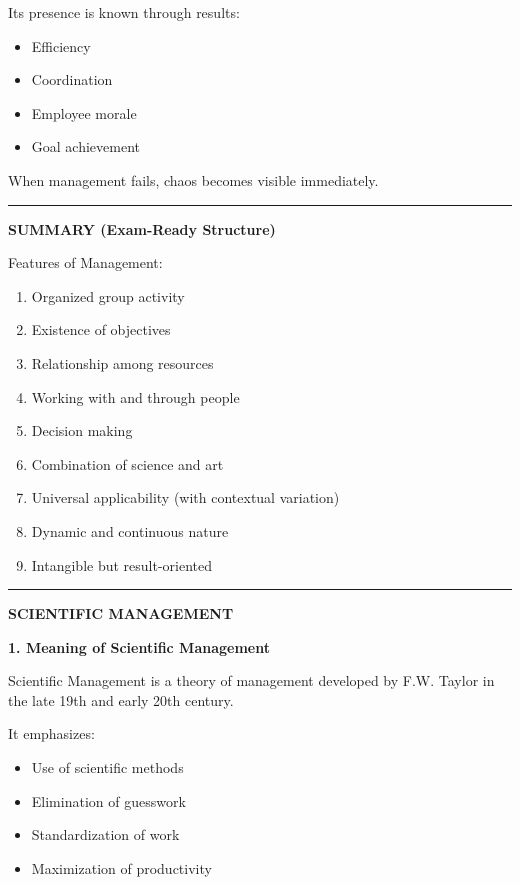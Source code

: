 \documentclass[10pt,a4paper]{article}
\newcommand{\separator}{\vspace{0.4em}\noindent\rule{\linewidth}{0.6pt}\vspace{0.4em}}
\begin{document}
Its presence is known through results:

\begin{itemize}
  \item Efficiency
  \item Coordination
  \item Employee morale
  \item Goal achievement
\end{itemize}

When management fails, chaos becomes visible immediately.

\separator

\textbf{SUMMARY (Exam-Ready Structure)}

Features of Management:

\begin{enumerate}
  \item Organized group activity
  \item Existence of objectives
  \item Relationship among resources
  \item Working with and through people
  \item Decision making
  \item Combination of science and art
  \item Universal applicability (with contextual variation)
  \item Dynamic and continuous nature
  \item Intangible but result-oriented
\end{enumerate}

\separator

\begin{center}
  \large\textbf{SCIENTIFIC MANAGEMENT}
\end{center}

\textbf{1. Meaning of Scientific Management}

Scientific Management is a theory of management developed by F.W. Taylor in the late 19th
and early 20th century.

It emphasizes:

\begin{itemize}
  \item Use of scientific methods
  \item Elimination of guesswork
  \item Standardization of work
  \item Maximization of productivity
\end{itemize}
\end{document}
